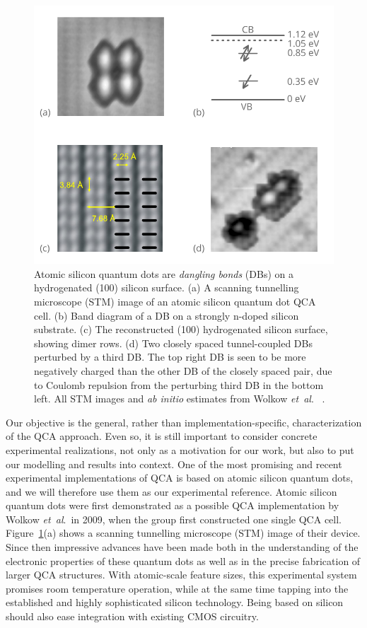 \begin{figure}
  \center
  \includegraphics{silicon}
  \caption{
Atomic silicon quantum dots are \emph{dangling bonds} (DBs) on a hydrogenated
(100) silicon surface. (a) A scanning tunnelling microscope (STM) image of an
atomic silicon quantum dot QCA cell. (b) Band diagram of a DB on a strongly
n-doped silicon substrate. (c) The reconstructed (100) hydrogenated silicon
surface, showing dimer rows. (d) Two closely spaced tunnel-coupled DBs perturbed
by a third DB. The top right DB is seen to be more negatively charged than the
other DB of the closely spaced pair, due to Coulomb repulsion from the
perturbing third DB in the bottom left. All STM images and \emph{ab initio}
estimates from Wolkow \emph{et~al}.\ \cite{wolkow2013silicon} \cite{pitters2011tunnel}.
}
  \label{fig:silicon}
\end{figure}

Our objective is the general, rather than implementation-specific,
characterization of the QCA approach. Even so, it is still important to consider
concrete experimental realizations, not only as a motivation for our work, but
also to put our modelling and results into context. One of the most promising
and recent experimental implementations of QCA is based on atomic silicon
quantum dots, and we will therefore use them as our experimental reference.
Atomic silicon quantum dots were first demonstrated as a possible QCA
implementation by Wolkow \emph{et~al}.\ in 2009, when the group first constructed one
single QCA cell. Figure~\ref{fig:silicon}(a) shows a scanning tunnelling
microscope (STM) image of their device. Since then impressive advances have been
made both in the understanding of the electronic properties of these quantum
dots as well as in the precise fabrication of larger QCA structures. With
atomic-scale feature sizes, this experimental system promises room temperature
operation, while at the same time tapping into the established and highly
sophisticated silicon technology. Being based on silicon should also ease
integration with existing CMOS circuitry.


